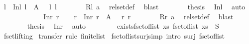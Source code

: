 \begin{isabellebody}
\ l{}\ \ {\isachardoublequoteopen}Inl\ l{}\ {\isasymin}\ A{}\ {\isasymand}\ {\isasymchi}\ l{}\ l{}{\isachardoublequoteclose}\isanewline
\ \ \ \ \ \ \isamarkupfalse%
\ Rl\ a{}\ \isamarkupfalse%
\ rel{\isacharunderscore}set{\isacharunderscore}def\ \isamarkupfalse%
\ blast\isanewline
\ \ \ \ \ \ \isamarkupfalse%
\ {\isacharquery}thesis\ \isamarkupfalse%
\ Inl\ \isamarkupfalse%
\ auto\isanewline
\ \ \ \ \isamarkupfalse%
\isanewline
\ \ \ \ \ \ \isamarkupfalse%
\ {\isacharparenleft}Inr\ r{}{\isacharparenright}\ \isamarkupfalse%
\ \isamarkupfalse%
\ r{}\ \ {\isachardoublequoteopen}Inr\ r{}\ {\isasymin}\ A{}\ {\isasymand}\ {\isasymphi}\ r{}\ r{}{\isachardoublequoteclose}\isanewline
\ \ \ \ \ \ \isamarkupfalse%
\ Rr\ a{}\ \isamarkupfalse%
\ rel{\isacharunderscore}set{\isacharunderscore}def\ \isamarkupfalse%
\ blast\isanewline
\ \ \ \ \ \ \isamarkupfalse%
\ {\isacharquery}thesis\ \isamarkupfalse%
\ Inr\ \isamarkupfalse%
\ auto\isanewline
\ \ \ \ \isamarkupfalse%
\isanewline
\ \ \isamarkupfalse%
\isanewline
{}\isamarkupfalse%
%
\endisatagproof
{\isafoldproof}%
%
\isadelimproof
%
\endisadelimproof
%
\isadelimdocument
%
\endisadelimdocument
%
\isatagdocument
%
\isamarkuptrue%
%
\endisatagdocument
{\isafolddocument}%
%
\isadelimdocument
%
\endisadelimdocument
{}\isamarkupfalse%
\ exists{\isacharunderscore}fset{\isacharunderscore}of{\isacharunderscore}list{\isacharcolon}\ {\isachardoublequoteopen}{\isasymexists}xs{\isachardot}\ fset{\isacharunderscore}of{\isacharunderscore}list\ xs\ {\isacharequal}\ S{\isachardoublequoteclose}\isanewline
{}\isamarkupfalse%
\ fset{\isachardot}lifting\isanewline
%
\isadelimproof
%
\endisadelimproof
%
\isatagproof
{}\isamarkupfalse%
\ transfer\ {\isacharparenleft}rule\ finite{\isacharunderscore}list{\isacharparenright}%
\endisatagproof
{\isafoldproof}%
%
\isadelimproof
\isanewline
%
\endisadelimproof
\isanewline
{}\isamarkupfalse%
\ fset{\isacharunderscore}of{\isacharunderscore}list{\isacharunderscore}surj{\isacharbrackleft}simp{\isacharcomma}\ intro{\isacharbrackright}{\isacharcolon}\ {\isachardoublequoteopen}surj\ fset{\isacharunderscore}of{\isacharunderscore}list{\isachardoublequoteclose}\isanewline

\end{isabellebody}
